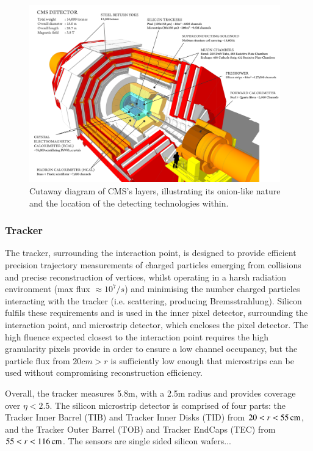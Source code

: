 \begin{figure}[htbp]
\begin{center}
\includegraphics[width=0.97\textwidth]{figs/cms/cms_120918_03.png}
\caption{Cutaway diagram of CMS’s layers, illustrating its onion-like nature and the location of the detecting technologies within.}
\label{fig:cern-accelerator-complex}
\end{center}
\end{figure}


\subsubsection{Tracker}
The tracker, surrounding the interaction point, is designed to provide efficient precision trajectory measurements of charged particles emerging from collisions and precise reconstruction of vertices, whilst operating in a harsh radiation environment (max flux $\approx 10^{7}/s$) and minimising the number charged particles interacting with the tracker (i.e. scattering, producing Bremsstrahlung).
Silicon fulfils these requirements and is used in the inner pixel detector, surrounding the interaction point, and microstrip detector, which encloses the pixel detector.
The high fluence expected closest to the interaction point requires the high granularity pixels provide in order to ensure a low channel occupancy, but the particle flux from $20cm > r$ is sufficiently low enough that microstrips can be used without compromising reconstruction efficiency.

Overall, the tracker measures 5.8m, with a 2.5m radius and provides coverage over $\eta < 2.5$.
The silicon microstrip detector is comprised of four parts: the Tracker Inner Barrel (TIB) and Tracker Inner Disks (TID) from $20 < r < 55\,\text{cm}$, and the Tracker Outer Barrel (TOB) and Tracker EndCaps (TEC) from $55 < r < 116\,\text{cm}$.
The sensors are single sided silicon wafers...


